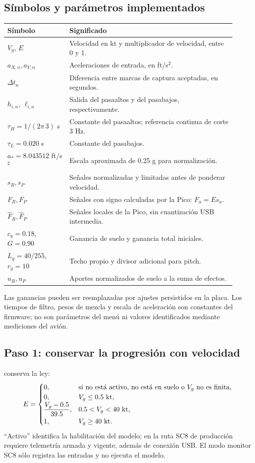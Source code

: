 \documentclass[11pt,a4paper]{article}
\newcommand{\code}[1]{\texttt{\detokenize{#1}}}
\begin{document}
\subsection{Símbolos y parámetros implementados}
\begin{longtable}{p{0.25\linewidth}p{0.67\linewidth}}
\toprule Símbolo & Significado\\\midrule\endhead
$V_g$, $E$ & Velocidad en kt y multiplicador de velocidad, entre 0 y 1.\\
$a_{X,n},a_{Y,n}$ & Aceleraciones de entrada, en ft/s$^2$.\\
$\Delta t_n$ & Diferencia entre marcas de captura aceptadas, en segundos.\\
$h_{i,n}$, $\ell_{i,n}$ & Salida del pasaaltos y del pasabajos, respectivamente.\\
$\tau_H=1/(2\pi\,3)$ s & Constante del pasaaltos; referencia continua de corte 3 Hz.\\
$\tau_L=0.020$ s & Constante del pasabajos.\\
$a_*=8.043512$ ft/s$^2$ & Escala aproximada de 0.25 g para normalización.\\
$s_R,s_P$ & Señales normalizadas y limitadas antes de ponderar velocidad.\\
$F_R,F_P$ & Señales con signo calculadas por la Pico: $F_a=E s_a$.\\
$\widehat F_R,\widehat F_P$ & Señales locales de la Pico, sin cuantización USB intermedia.\\
$c_g=0.18$, $G=0.90$ & Ganancia de suelo y ganancia total iniciales.\\
$L_g=40/255$, $r_g=10$ & Techo propio y divisor adicional para pitch.\\
$u_R,u_P$ & Aportes normalizados de suelo a la suma de efectos.\\
\bottomrule
\end{longtable}
Las ganancias pueden ser reemplazadas por ajustes persistidos en la placa. Los tiempos de filtro, pesos de mezcla y escala de aceleración son constantes del firmware; no son parámetros del menú ni valores identificados mediante mediciones del avión.

\subsection{Paso 1: conservar la progresión con velocidad}
\code{GroundModel.h::envelope} conserva la ley:
\begin{equation}
E=\begin{cases}
0,&\text{si no está activo, no está en suelo o }V_g\text{ no es finita},\\
0,&V_g\le0.5\ {\rm kt},\\
\displaystyle\frac{V_g-0.5}{39.5},&0.5<V_g<40\ {\rm kt},\\[3pt]
1,&V_g\ge40\ {\rm kt}.
\end{cases}
\label{eq:ground-envelope}
\end{equation}
``Activo'' identifica la habilitación del modelo; en la ruta SC8 de producción requiere telemetría armada y vigente, además de conexión USB. El modo monitor SC8 sólo registra las entradas y no ejecuta el modelo.
\end{document}

